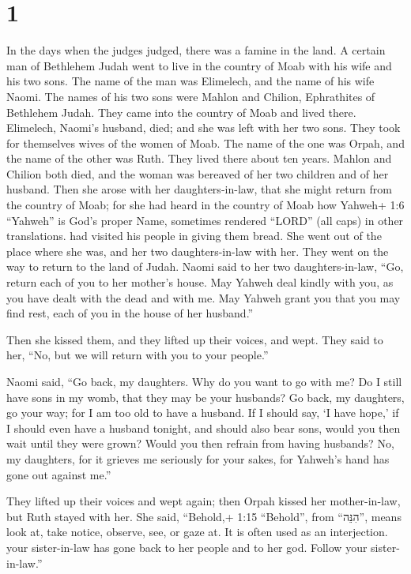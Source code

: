 \hypertarget{section}{%
\section{1}\label{section}}

 In the days when the judges judged, there was a famine in
the land. A certain man of Bethlehem Judah went to live in the country
of Moab with his wife and his two sons.  The name of the man
was Elimelech, and the name of his wife Naomi. The names of his two sons
were Mahlon and Chilion, Ephrathites of Bethlehem Judah. They came into
the country of Moab and lived there.  Elimelech, Naomi's
husband, died; and she was left with her two sons.  They
took for themselves wives of the women of Moab. The name of the one was
Orpah, and the name of the other was Ruth. They lived there about ten
years.  Mahlon and Chilion both died, and the woman was
bereaved of her two children and of her husband.  Then she
arose with her daughters-in-law, that she might return from the country
of Moab; for she had heard in the country of Moab how Yahweh+ 1:6
``Yahweh'' is God's proper Name, sometimes rendered ``LORD'' (all caps)
in other translations. had visited his people in giving them bread.
 She went out of the place where she was, and her two
daughters-in-law with her. They went on the way to return to the land of
Judah.  Naomi said to her two daughters-in-law, ``Go, return
each of you to her mother's house. May Yahweh deal kindly with you, as
you have dealt with the dead and with me.  May Yahweh grant
you that you may find rest, each of you in the house of her husband.''

Then she kissed them, and they lifted up their voices, and wept.
 They said to her, ``No, but we will return with you to
your people.''

 Naomi said, ``Go back, my daughters. Why do you want to go
with me? Do I still have sons in my womb, that they may be your
husbands?  Go back, my daughters, go your way; for I am too
old to have a husband. If I should say, `I have hope,' if I should even
have a husband tonight, and should also bear sons,  would
you then wait until they were grown? Would you then refrain from having
husbands? No, my daughters, for it grieves me seriously for your sakes,
for Yahweh's hand has gone out against me.''

 They lifted up their voices and wept again; then Orpah
kissed her mother-in-law, but Ruth stayed with her.  She
said, ``Behold,+ 1:15 ``Behold'', from ``הִנֵּה'', means look at, take
notice, observe, see, or gaze at. It is often used as an interjection.
your sister-in-law has gone back to her people and to her god. Follow
your sister-in-law.''

